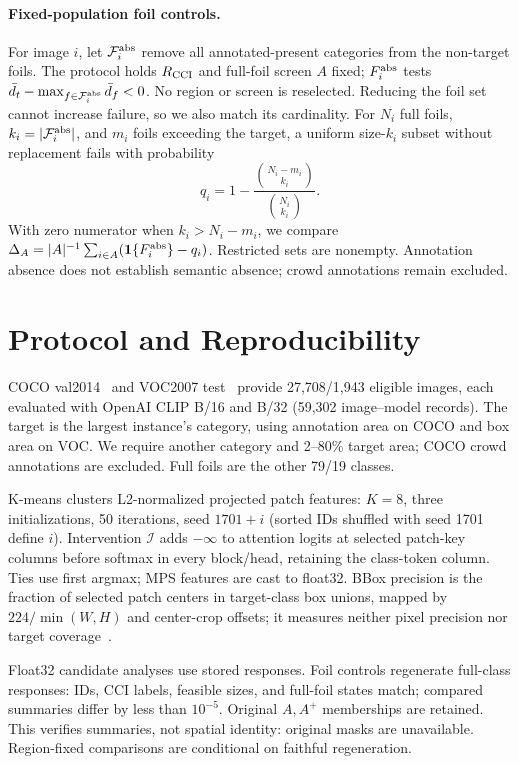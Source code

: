 \documentclass[10pt]{article}
\newcommand{\foils}{\mathcal F}
\begin{document}
\paragraph{Fixed-population foil controls.}
For image $i$, let $\foils_i^{\rm abs}$ remove all annotated-present categories
from the non-target foils. The protocol holds $R_{\rm CCI}$ and full-foil screen $A$ fixed;
$F_i^{\rm abs}$ tests $\bar d_t-\max_{f\in\foils_i^{\rm abs}}\bar d_f<0$.
No region or screen is reselected. Reducing the foil set cannot increase
failure, so we also match its cardinality. For $N_i$ full
foils, $k_i=|\foils_i^{\rm abs}|$, and $m_i$ foils exceeding the target,
a uniform size-$k_i$ subset without replacement fails with probability
\begin{equation}
q_i=1-\frac{\binom{N_i-m_i}{k_i}}{\binom{N_i}{k_i}}.
\label{eq:matched}
\end{equation}
With zero numerator when $k_i>N_i-m_i$, we compare
$\Delta_A=|A|^{-1}\sum_{i\in A}(\mathbf1\{F_i^{\rm abs}\}-q_i)$.
Restricted sets are nonempty. \mbox{Annotation} absence does not establish semantic
absence; crowd annotations remain excluded.

\section{Protocol and Reproducibility}
COCO val2014~\cite{lin2014coco} and VOC2007 test~\cite{everingham2010voc}
provide 27,708/1,943 eligible images, each evaluated with OpenAI CLIP B/16
and B/32 (59,302 image--model records). The target is the largest instance's
category, using annotation area on COCO and box area on VOC. We require
another category and 2--80\% target area; COCO crowd annotations are excluded.
Full foils are the other 79/19 classes.

K-means clusters L2-normalized projected patch features: $K=8$, three
initializations, 50 iterations, seed $1701+i$ (sorted IDs shuffled with seed
1701 define $i$). Intervention $\mathcal I$
adds $-\infty$ to attention logits at selected patch-key columns before
softmax in every block/head, retaining the class-token column. Ties use first argmax; MPS features are cast to float32.
BBox precision is the fraction of selected patch centers in target-class box unions,
mapped by $224/\min(W,H)$ and center-crop offsets; it measures neither pixel
precision nor target coverage~\cite{gomez2022metrics}.

Float32 candidate analyses use stored responses. Foil controls regenerate
full-class responses: IDs, CCI labels, feasible sizes, and full-foil states
match; compared summaries differ by less than $10^{-5}$. Original $A,A^+$
memberships are retained. This verifies summaries, not
spatial identity: original masks are unavailable. Region-fixed comparisons
are conditional on faithful regeneration.
\end{document}
